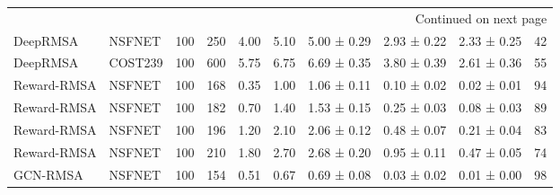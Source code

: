 \begin{longtable}[!htbp]{llll|lllll|l}
\hline
\multicolumn{10}{r}{Continued on next page} \\
\endfoot

\hline
\endlastfoot

DeepRMSA             & NSFNET            & 100                  & 250                                                               & 4.00    & \multicolumn{1}{l|}{5.10}     & 5.00 ± 0.29 & 2.93 ± 0.22      & 2.33 ± 0.25                  & 42                                                                                    \\
DeepRMSA             & COST239           & 100                  & 600                                                               & 5.75 & \multicolumn{1}{l|}{6.75}    & 6.69 ± 0.35  & 3.80 ± 0.39      & 2.61 ± 0.36                  & 55                                                                                    \\
Reward-RMSA          & NSFNET            & 100                  & 168                                                               & 0.35  & \multicolumn{1}{l|}{1.00}       & 1.06 ± 0.11  & 0.10 ± 0.02      & 0.02 ± 0.01                  & 94                                                                                    \\
Reward-RMSA          & NSFNET            & 100                  & 182                                                               & 0.70  & \multicolumn{1}{l|}{1.40}       & 1.53 ± 0.15  & 0.25 ± 0.03      & 0.08 ± 0.03                  & 89                                                                                    \\
Reward-RMSA          & NSFNET            & 100                  & 196                                                               & 1.20  & \multicolumn{1}{l|}{2.10}       & 2.06 ± 0.12  & 0.48 ± 0.07      & 0.21 ± 0.04                  & 83                                                                                    \\
Reward-RMSA          & NSFNET            & 100                  & 210                                                               & 1.80  & \multicolumn{1}{l|}{2.70}       & 2.68 ± 0.20 & 0.95 ± 0.11      & 0.47 ± 0.05                  & 74                                                                                    \\                                                      
GCN-RMSA             & NSFNET            & 100                  & 154                                                               & 0.51 & \multicolumn{1}{l|}{0.67}    & 0.69 ± 0.08 & 0.03 ± 0.02      & 0.01 ± 0.00                  & 98                                                                                    \\

\end{longtable}
